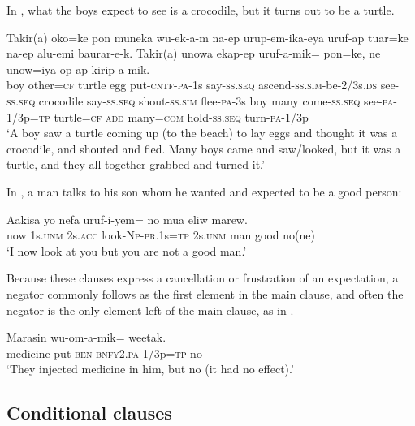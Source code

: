 In , what the boys expect to see is a crocodile, but it turns out to be a turtle.

\ea%
\label{ex:8:x1393}
\gll Takir(a)  oko=ke  pon  muneka  wu-ek-a-m  na-ep urup-em-ika-eya  uruf-ap  tuar=ke  na-ep alu-emi  baurar-e-k.  Takir(a)  unowa  ekap-ep uruf-a-mik=  pon=ke,  ne  unow=iya  op-ap kirip-a-mik.\\
boy  other=\textsc{cf} turtle egg  put-\textsc{cntf}-\textsc{pa}-1s  say-\textsc{ss}.\textsc{seq} ascend-\textsc{ss}.\textsc{sim}-be-2/3s.\textsc{ds} see-\textsc{ss}.\textsc{seq} crocodile say-\textsc{ss}.\textsc{seq} shout-\textsc{ss}.\textsc{sim} flee-\textsc{pa}-3s boy  many come-\textsc{ss}.\textsc{seq} see-\textsc{pa}-1/3p=\textsc{tp} turtle=\textsc{cf} \textsc{add} many=\textsc{com} hold-\textsc{ss}.\textsc{seq} turn-\textsc{pa}-1/3p\\
\glt`A boy saw a turtle coming up (to the beach) to lay eggs and thought it was a crocodile, and shouted and fled. Many boys came and saw/looked, but it was a turtle, and they all together grabbed and turned it.'
\z
{}


In , a man talks to his son whom he wanted and expected to be a good person:

\ea%
\label{ex:8:x1397}
\gll Aakisa  yo  nefa  uruf-i-yem= no  mua eliw marew.\\
now  1s.\textsc{unm} 2s.\textsc{acc} look-\textsc{Np}-\textsc{pr}.1s=\textsc{tp} 2s.\textsc{unm} man good no(ne)\\
\glt`I now look at you but you are not a good man.'
\z


Because these clauses express a cancellation or frustration of an expectation, a negator commonly follows as the first element in the main clause, and often the negator is the only element left of the main clause, as in .

\ea%
\label{ex:8:x1398}
\gll Marasin  wu-om-a-mik=  weetak.\\
medicine put-\textsc{ben}-\textsc{bnfy}2.\textsc{pa}-1/3p=\textsc{tp} no\\
\glt`They injected medicine in him, but no (it had no effect).'
\z


\subsection{Conditional clauses}  \label{sec:8.3.5}

